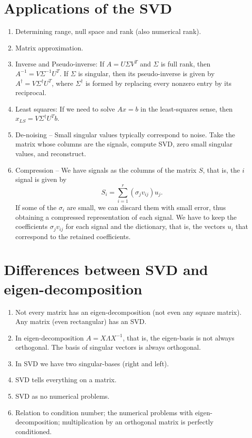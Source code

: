 \documentclass{article}
\begin{document}
\section{Applications of the SVD}
\begin{enumerate}
\item Determining range, null space and rank (also numerical rank).
\item Matrix approximation.
\item Inverse and Pseudo-inverse: If $A=U \Sigma V^{T}$ and $\Sigma$
is full rank, then $A^{-1}=V \Sigma^{-1} U^{T}$. If $\Sigma$ is
singular, then its pseudo-inverse is given by $A^{\dagger}=V
\Sigma^{\dagger} U^{T}$, where $\Sigma^{\dagger}$ is formed by
replacing every nonzero entry by its reciprocal.
\item Least squares: If we need to solve $Ax=b$ in the least-squares
sense, then $x_{LS}=V \Sigma^{\dagger} U^{T} b$.
\item De-noising -- Small singular values typically correspond to
noise. Take the matrix whose columns are the signals, compute SVD,
zero small singular values, and reconstruct.
\item Compression -- We have signals as the columns of the matrix
$S$, that is, the $i$ signal is given by
\begin{equation*}
S_{i} = \sum_{i=1}^{r} \left ( \sigma_{j} v_{ij} \right ) u_{j}.
\end{equation*}
If some of the $\sigma_{i}$ are small, we can discard them with
small error, thus obtaining a compressed representation of each
signal. We have to keep the coefficients $\sigma_{j} v_{ij}$ for
each signal and the dictionary, that is, the vectors $u_{i}$ that
correspond to the retained coefficients.
\end{enumerate}


\section{Differences between SVD and eigen-decomposition}
\begin{enumerate}
\item Not every matrix has an eigen-decomposition (not even any
square matrix).  Any matrix (even rectangular) has an SVD.
\item In eigen-decomposition $A=X \Lambda X^{-1}$, that is, the
eigen-basis is not always orthogonal. The basis of singular vectors
is always orthogonal.
\item In SVD we have two singular-bases (right and left).
\item SVD tells everything on a matrix.
\item SVD as no numerical problems.
\item Relation to condition number; the numerical problems with
eigen-decomposition; multiplication by an orthogonal matrix is
perfectly conditioned.
\end{enumerate}
\end{document}
